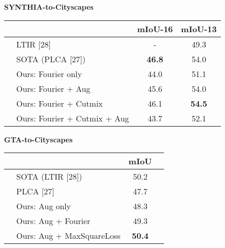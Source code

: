 \documentclass[final]{cvpr}
\begin{document}
\begin{table*}
\begin{center}


\textbf{SYNTHIA-to-Cityscapes}

\vspace{1mm}
\begin{tabular}{rl|c|c}
&    & mIoU-16 & mIoU-13 \\ \hline \addlinespace[1mm]
& LTIR [28]                        & -       & 49.3    \\
& SOTA (PLCA [27])                 & \textbf{46.8}    & 54.0    \\ \addlinespace[1mm] \hdashline \addlinespace[1mm]
& Ours: Fourier only                     & 44.0    & 51.1    \\
& Ours: Fourier + Aug                    & 45.6    & 54.0    \\
& Ours: Fourier + Cutmix                 & 46.1    & \textbf{54.5}    \\
& Ours: Fourier + Cutmix + Aug           & 43.7    & 52.1   
\end{tabular}

\vspace{5mm}

\textbf{GTA-to-Cityscapes}

\vspace{1mm}
\begin{tabular}{rl|cc}
  &    & mIoU           & \hspace{8mm}  \\ \hline \addlinespace[1mm]
              & SOTA (LTIR [28])                 & 50.2           &   \\
              & PLCA [27]                        & 47.7           &   \\ \hdashline \addlinespace[1mm]
              & Ours: Aug only                         & 48.3           &   \\
              & Ours: Aug + Fourier                    & 49.3           &   \\
              & Ours: Aug + MaxSquareLoss \hspace{8mm}              & \textbf{50.4}  & 
\end{tabular}
\end{center}
\vspace{-2mm}
\caption{Performance of additional combinations of perturbation functions compared to SOTA.}
\vspace{-5mm}
\label{table:new_experiments}
\end{table*}
\end{document}
